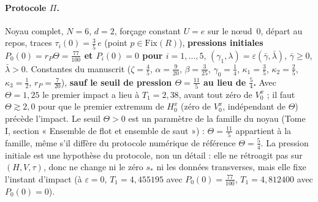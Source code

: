 \documentclass[11pt,a4paper]{article}
\theoremstyle{remark}
\begin{document}
\paragraph{Protocole $\Pi$.} Noyau complet, $N=6$, $d=2$, forçage constant $U=e$ sur le nœud~0, départ au repos, traces $\tau_i(0)=\tfrac35\,e$ (point $p\in\mathrm{Fix}(R)$), \textbf{pressions initiales $P_0(0)=r_P\Theta=\tfrac{77}{100}$ et $P_i(0)=0$ pour $i=1,\dots,5$}, $(\gamma_1,\lambda)=\varepsilon(\bar\gamma,\bar\lambda)$, $\bar\gamma\ge0$, $\bar\lambda>0$. Constantes du manuscrit ($\zeta=\frac45$, $\alpha=\frac9{20}$, $\beta=\frac3{25}$, $\gamma_0=\frac14$, $\kappa_1=\frac35$, $\kappa_2=\frac25$, $\kappa_3=\frac12$, $r_P=\frac7{20}$), \textbf{sauf le seuil de pression $\Theta=\frac{11}5$ au lieu de $\frac54$.} Avec $\Theta=1{,}25$ le premier impact a lieu à $T_1=2{,}38$, avant tout zéro de $V_0^x$ ; il faut $\Theta\gtrsim2{,}0$ pour que le premier extremum de $H_0^x$ (zéro de $V_0^x$, indépendant de $\Theta$) précède l'impact. Le seuil $\Theta>0$ est un paramètre de la famille du noyau (Tome I, section « Ensemble de flot et ensemble de saut ») : $\Theta=\frac{11}5$ appartient à la famille, même s'il diffère du protocole numérique de référence $\Theta=\frac54$. La pression initiale est une hypothèse du protocole, non un détail : elle ne rétroagit pas sur $(H,V,\tau)$, donc ne change ni le zéro $s_*$ ni les données transverses, mais elle fixe l'instant d'impact (à $\varepsilon=0$, $T_1=4{,}455195$ avec $P_0(0)=\frac{77}{100}$, $T_1=4{,}812400$ avec $P_0(0)=0$).
\end{document}
